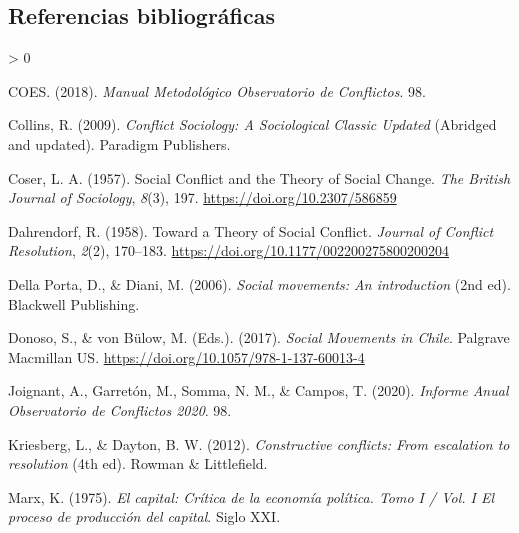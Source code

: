\documentclass[
  12pt,
]{article}
\newlength{\cslhangindent}
\newenvironment{CSLReferences}[2] %
 {%
  \setlength{\parindent}{0pt}
  \ifodd #1 \everypar{\setlength{\hangindent}{\cslhangindent}}\ignorespaces\fi
  \ifnum #2 > 0
  \setlength{\parskip}{#2\baselineskip}
  \fi
 }%
 {}
\begin{document}
\hypertarget{referencias-bibliogruxe1ficas}{%
\subsection{Referencias
bibliográficas}\label{referencias-bibliogruxe1ficas}}

\doublespacing

\hypertarget{refs}{}
\begin{CSLReferences}{1}{0}
\leavevmode\hypertarget{ref-coesManualMetodologicoObservatorio2018}{}%
COES. (2018). \emph{{Manual Metodológico Observatorio de Conflictos}}.
98.

\leavevmode\hypertarget{ref-collinsConflictSociologySociological2009a}{}%
Collins, R. (2009). \emph{Conflict {Sociology}: {A Sociological Classic
Updated}} (Abridged and updated). {Paradigm Publishers}.

\leavevmode\hypertarget{ref-coserSocialConflictTheory1957a}{}%
Coser, L. A. (1957). Social {Conflict} and the {Theory} of {Social
Change}. \emph{The British Journal of Sociology}, \emph{8}(3), 197.
\url{https://doi.org/10.2307/586859}

\leavevmode\hypertarget{ref-dahrendorfTheorySocialConflict1958a}{}%
Dahrendorf, R. (1958). Toward a {Theory} of {Social Conflict}.
\emph{Journal of Conflict Resolution}, \emph{2}(2), 170--183.
\url{https://doi.org/10.1177/002200275800200204}

\leavevmode\hypertarget{ref-dellaportaSocialMovementsIntroduction2006}{}%
Della Porta, D., \& Diani, M. (2006). \emph{Social movements: An
introduction} (2nd ed). {Blackwell Publishing}.

\leavevmode\hypertarget{ref-donosoSocialMovementsChile2017a}{}%
Donoso, S., \& von Bülow, M. (Eds.). (2017). \emph{Social {Movements} in
{Chile}}. {Palgrave Macmillan US}.
\url{https://doi.org/10.1057/978-1-137-60013-4}

\leavevmode\hypertarget{ref-joignantInformeAnualObservatorio2020}{}%
Joignant, A., Garretón, M., Somma, N. M., \& Campos, T. (2020).
\emph{{Informe Anual Observatorio de Conflictos 2020}}. 98.

\leavevmode\hypertarget{ref-kriesbergConstructiveConflictsEscalation2012}{}%
Kriesberg, L., \& Dayton, B. W. (2012). \emph{Constructive conflicts:
From escalation to resolution} (4th ed). {Rowman \& Littlefield}.

\leavevmode\hypertarget{ref-marxCapital1975}{}%
Marx, K. (1975). \emph{El capital: Crítica de la economía política.
{Tomo I} / {Vol}. {I El} proceso de producción del capital}. {Siglo
XXI}.


\end{CSLReferences}
\end{document}
